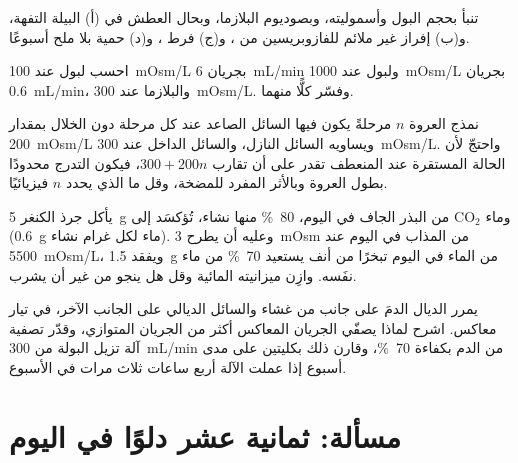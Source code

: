 \begin{exercise}[$\star\star$]\label{exo:b3:renal-osmoregulation:8}
تنبأ بحجم البول وأسموليته، وبصوديوم البلازما، وبحال العطش في
(أ) البيلة التفهة، و(ب) إفراز غير ملائم للفازوبريسين من ،
و(ج) فرط ، و(د) حمية بلا ملح أسبوعًا.
\end{exercise}

\begin{exercise}[$\star\star$]\label{exo:b3:renal-osmoregulation:9}
احسب  لبول عند \qty{100}{mOsm/L} بجريان
\qty{6}{mL/min} ولبول عند \qty{1000}{mOsm/L} بجريان
\qty{0.6}{mL/min}، والبلازما عند \qty{300}{mOsm/L}. وفسّر كلًّا منهما.
\end{exercise}

\begin{exercise}[$\star\star\star$]\label{exo:b3:renal-osmoregulation:10}
نمذج العروة $n$ مرحلةً يكون فيها السائل الصاعد عند كل مرحلة
دون الخلال بمقدار \qty{200}{mOsm/L} ويساويه السائل النازل، والسائل
الداخل عند \qty{300}{mOsm/L}. واحتجّ لأن  الحالة
المستقرة عند المنعطف تقدر على أن تقارب $300 +
200n$، فيكون التدرج محدودًا بطول العروة وبالأثر المفرد
للمضخة، وقل ما الذي يحدد $n$ فيزيائيًا.
\end{exercise}

\begin{exercise}[$\star\star\star$]\label{exo:b3:renal-osmoregulation:11}
يأكل جرذ الكنغر \qty{5}{g} من البذر الجاف في اليوم،
\qty{80}{\%} منها نشاء، تُؤكسَد إلى CO$_{2}$ وماء (\qty{0.6}{g}
ماء لكل غرام نشاء). وعليه أن يطرح \qty{3}{mOsm} من المذاب في
اليوم عند \qty{5500}{mOsm/L}، ويفقد \qty{1.5}{g} من الماء في
اليوم تبخرًا من أنف يستعيد \qty{70}{\%} من ماء نفَسه. وازِن
ميزانيته المائية وقل هل ينجو من غير أن يشرب.
\end{exercise}

\begin{exercise}[$\star\star\star$]\label{exo:b3:renal-osmoregulation:12}
يمرر الديال الدمَ على جانب من غشاء والسائل الديالي على
الجانب الآخر، في تيار معاكس. اشرح لماذا يصفّي الجريان
المعاكس أكثر من الجريان المتوازي، وقدّر تصفية آلة تزيل
البولة من \qty{300}{mL/min} من الدم بكفاءة \qty{70}{\%}،
وقارن ذلك بكليتين على مدى أسبوع إذا عملت الآلة أربع ساعات
ثلاث مرات في الأسبوع.
\end{exercise}

\section{مسألة: ثمانية عشر دلوًا في اليوم}

